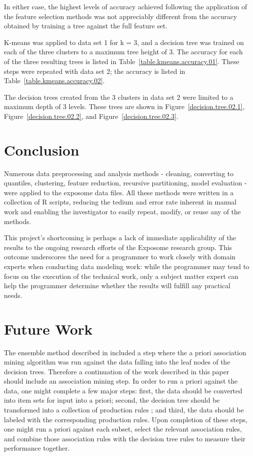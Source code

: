 \documentclass[conference,compsoc]{IEEEtran}
\begin{document}
In either case, the highest levels of accuracy achieved following the application of the feature selection methods was not appreciably different
from the accuracy obtained by training a tree against the full feature set.

K-means was applied to data set 1 for k = 3, and a decision tree was trained on each of the three clusters to a maximum tree height of 3. 
The accuracy for each of the three resulting trees is listed in Table~\ref{table.kmeans.accuracy.01}.
These steps were repeated with data set 2; the accuracy is listed in Table~\ref{table.kmeans.accuracy.02}.

The decision trees created from the 3 clusters in data set 2 were limited to a maximum depth of 3 levels. These trees are shown in 
Figure~\ref{decision.tree.02.1}, Figure~\ref{decision.tree.02.2}, and Figure~\ref{decision.tree.02.3}.

\section{Conclusion}

Numerous data preprocessing and analysis methods - cleaning, converting to quantiles, clustering, feature reduction,
recursive partitioning, model evaluation - were applied to the exposome data files. All these methods were written in a collection of R
scripts, reducing the tedium and error rate inherent in manual work and enabling the investigator to easily repeat,
modify, or reuse any of the methods.

This project's shortcoming is perhaps a lack of immediate applicability of the results to the ongoing research efforts of the Exposome research group. This outcome underscores the need for a programmer to work closely with domain experts when conducting data modeling work:
while the programmer may tend to focus on the execution of the technical work, only a subject matter expert can help the programmer determine whether the results will fulfill any practical needs.

\section{Future Work}

The ensemble method described in \cite{datta} included a step where the a priori association mining algorithm
was run against the data falling into the leaf nodes of the decision trees. Therefore a continuation of the work described in this paper should include an association
mining step. In order to run a priori against the data, one might complete a few major steps: first, the data should be converted into item sets for 
input into a priori; second, the decision tree should be transformed into a collection of production rules \cite{quinlan2}; and third, the data should be labeled with 
the corresponding production rules. Upon completion of these steps, one might run a priori against each subset, select the relevant association rules, and
combine those association rules with the decision tree rules to measure their performance together.
\end{document}
